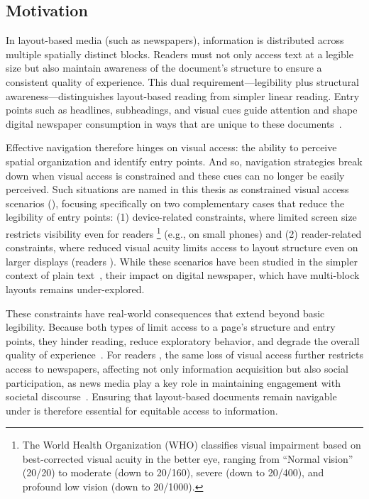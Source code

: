 



\subsection{Motivation}
\label{sec:magnification-motivation}


In layout-based media (such as newspapers), information is distributed across multiple spatially distinct blocks. Readers must not only access text at a legible size but also maintain awareness of the document's structure to ensure a consistent quality of experience. This dual requirement---legibility plus structural awareness---distinguishes layout-based reading from simpler linear reading. Entry points such as headlines, subheadings, and visual cues guide attention and shape digital newspaper consumption in ways that are unique to these documents~\cite{holmqvist_role_2005, zambarbieri_eye_2008, holmberg_eye_2004, eraslan_eye_2015}.

Effective navigation therefore hinges on visual access: the ability to perceive spatial organization and identify entry points. And so, navigation strategies break down when visual access is constrained and these cues can no longer be easily perceived. Such situations are named in this thesis as constrained visual access scenarios (\CVAS), focusing specifically on two complementary cases that reduce the legibility of entry points: (1) device-related constraints, where limited screen size restricts visibility even for readers \NV\footnote{The World Health Organization (WHO) classifies visual impairment based on best-corrected visual acuity in the better eye, ranging from ``Normal vision'' (20/20) to moderate (down to 20/160), severe (down to 20/400), and profound low vision (down to 20/1000).} (e.g., on small phones) and (2) reader-related constraints, where reduced visual acuity limits access to layout structure even on larger displays (readers \LV)\footnotemark[\value{footnote}]. While these scenarios have been studied in the simpler context of plain text~\cite{atilgan2020}, their impact on digital newspaper, which have multi-block layouts remains under-explored.

These constraints have real-world consequences that extend beyond basic legibility. Because both types of \CVAS limit access to a page's structure and entry points, they hinder reading, reduce exploratory behavior, and degrade the overall quality of  experience~\cite{Nielsen2011, Budiu2015, moran2016reading}. For readers \LV, the same loss of visual access further restricts access to newspapers, affecting not only information acquisition but also social participation, as news media play a key role in maintaining engagement with societal discourse~\cite{Hajek2023}. Ensuring that layout-based documents remain navigable under \CVAS is therefore essential for equitable access to information.

